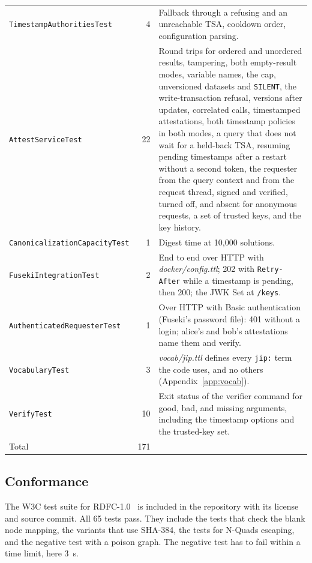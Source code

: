 \documentclass[11pt,a4paper]{article}
\newcommand{\code}[1]{\texttt{#1}}
\newcommand{\file}[1]{\textit{#1}}
\begin{document}
\begin{table}[htbp]
\begin{tabularx}{\linewidth}{@{}>{\raggedright\arraybackslash}p{50mm}r>{\raggedright\arraybackslash}X@{}}
\code{TimestampAuthoritiesTest} & 4 & Fallback through a refusing and an unreachable TSA,
cooldown order, configuration parsing. \\
\code{AttestServiceTest} & 22 & Round trips for ordered and unordered results, tampering,
both empty-result modes, variable names, the cap, unversioned datasets and \code{SILENT}, the
write-transaction refusal, versions after updates, correlated calls, timestamped
attestations, both timestamp policies in both modes, a query that does not wait for a held-back
TSA, resuming pending timestamps after a restart without a second token, the requester from
the query context and from the request thread, signed and verified, turned off, and absent for
anonymous requests, a set of trusted keys, and the key history. \\
\code{CanonicalizationCapacityTest} & 1 & Digest time at 10,000 solutions. \\
\code{FusekiIntegrationTest} & 2 & End to end over HTTP with \file{docker/config.ttl}; 202
with \code{Retry-After} while a timestamp is pending, then 200; the JWK Set at
\code{/keys}. \\
\code{AuthenticatedRequesterTest} & 1 & Over HTTP with Basic authentication (Fuseki's password
file): 401 without a login; alice's and bob's attestations name them and verify. \\
\code{VocabularyTest} & 3 & \file{vocab/jip.ttl} defines every \code{jip:} term the code uses,
and no others (Appendix~\ref{app:vocab}). \\
\code{VerifyTest} & 10 & Exit status of the verifier command for good, bad, and missing
arguments, including the timestamp options and the trusted-key set. \\
\midrule
Total & 171 & \\
\bottomrule
\end{tabularx}
\end{table}

\subsection{Conformance}
\label{sec:conformance}

The W3C test suite for RDFC-1.0~\cite{rdfcsuite} is included in the repository with its
license and source commit. All 65 tests pass. They include the tests that check the blank node
mapping, the variants that use SHA-384, the tests for N-Quads escaping, and the negative test
with a poison graph. The negative test has to fail within a time limit, here 3~s.
\end{document}
